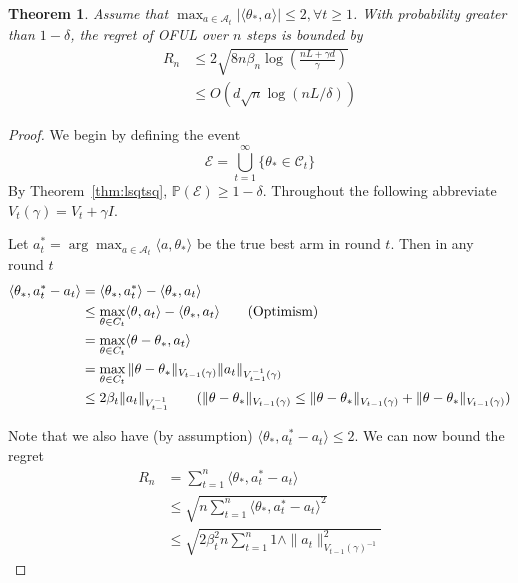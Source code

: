 \documentclass[11pt]{article}
\newtheorem{theorem}{Theorem}
\renewcommand{\P}{\mathbb{P}}
\newcommand{\mc}[1]{\mathcal{#1}}
\newcommand{\1}[1]{\mathbf{1}\left\{#1\right\}}
\begin{document}
\begin{theorem}
    Assume that $\max_{a\in \mc{A}_{t}}|\langle\theta_{\ast}, a\rangle| \leq 2, \forall t\geq 1$. With probability greater than $1-\delta$, the regret of OFUL over $n$ steps is bounded by
    \begin{align*}
        R_n 
        &\leq 2\sqrt{8n\beta_n \log\left(\frac{nL + \gamma d}{\gamma}\right)}\\
        &\leq O(d\sqrt{n}\log(n L/\delta))
    \end{align*}
\end{theorem}
\begin{proof}
    We begin by defining the event 
    \[\mc{E} = \bigcup_{t=1}^{\infty} \{\theta_{\ast} \in \mc{C}_t\}\]
    By Theorem~\ref{thm:lsqtsq}, $\P(\mc{E}) \geq 1-\delta$. Throughout the following abbreviate $V_t(\gamma) = V_t + \gamma I$.

    Let $a_{t}^{\ast} = \arg\max_{a\in \mc{A}_t} \langle a, \theta_{\ast}\rangle$ be the true best arm in round $t$. Then in any round $t$
    \begin{align*}
        \langle \theta_{\ast}, a_t^{\ast} - a_t\rangle
        &= \langle\theta_{\ast}, a_t^{\ast}\rangle  - \langle\theta_{\ast},a_t\rangle\\
        &\leq \max_{\theta\in C_t}\langle\theta, a_t\rangle  - \langle\theta_{\ast},a_t\rangle\tag{Optimism}\\
        &=\max_{\theta\in C_t}\langle\theta - \theta_{\ast}, a_t \rangle\\
        &=\max_{\theta\in C_t}\|\theta - \theta_{\ast}\|_{V_{t-1}(\gamma)} \|a_t\|_{V_{t-1}^{-1}(\gamma)}\\
        &\leq 2\beta_t \|a_t\|_{V_{t-1}^{-1}}  \tag{$\|\theta - \theta_{\ast}\|_{V_{t-1}(\gamma)} \leq \|\theta - \theta_{\ast}\|_{V_{t-1}(\gamma)} +\|\theta - \theta_{\ast}\|_{V_{t-1}(\gamma)}$}
    \end{align*}

    Note that we also have (by assumption) $\langle\theta_{\ast}, a_t^{\ast} - a_t\rangle \leq 2$. We can now bound the regret
    \begin{align*}
        R_{n} 
        &= \sum_{t=1}^n \langle \theta_{\ast}, a_t^{\ast} - a_t\rangle\\
        &\leq \sqrt{n \sum_{t=1}^n \langle \theta_{\ast}, a_t^{\ast} - a_t\rangle^2}\\
        &\leq \sqrt{2\beta_t^2 n \sum_{t=1}^n 1\wedge\|a_t\|^2_{V_{t-1}(\gamma)^{-1}}}
    \end{align*}



\end{proof}
\end{document}
